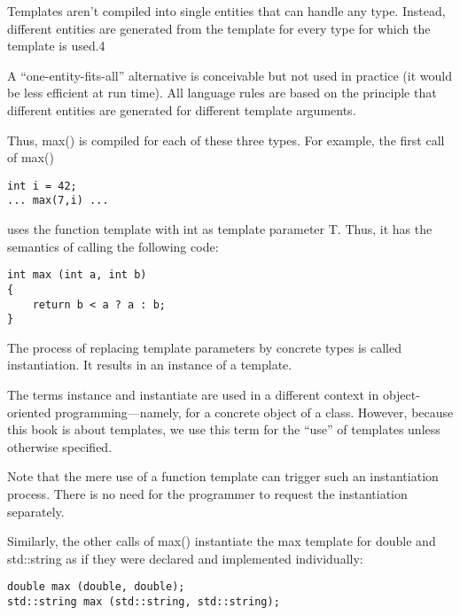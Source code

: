 Templates aren’t compiled into single entities that can handle any type. Instead, different entities are generated from the template for every type for which the template is used.4 

\begin{tcolorbox}[colback=webgreen!5!white,colframe=webgreen!75!black]
\hspace*{0.75cm}A “one-entity-fits-all” alternative is conceivable but not used in practice (it would be less efficient at run time). All language rules are based on the principle that different entities are generated for different template arguments.
\end{tcolorbox}

Thus, max() is compiled for each of these three types. For example, the first call of max()

\begin{lstlisting}[style=styleCXX]
int i = 42;
... max(7,i) ...
\end{lstlisting}

uses the function template with int as template parameter T. Thus, it has the semantics of calling the following code:

\begin{lstlisting}[style=styleCXX]
int max (int a, int b)
{
	return b < a ? a : b;
}
\end{lstlisting}

The process of replacing template parameters by concrete types is called instantiation. It results in an instance of a template.

\begin{tcolorbox}[colback=webgreen!5!white,colframe=webgreen!75!black]
\hspace*{0.75cm}The terms instance and instantiate are used in a different context in object-oriented programming—namely, for a concrete object of a class. However, because this book is about templates, we use this term for the “use” of templates unless otherwise specified.
\end{tcolorbox}

Note that the mere use of a function template can trigger such an instantiation process. There is no need for the programmer to request the instantiation separately.

Similarly, the other calls of max() instantiate the max template for double and std::string as if they were declared and implemented individually:

\begin{lstlisting}[style=styleCXX]
double max (double, double);
std::string max (std::string, std::string);
\end{lstlisting}

